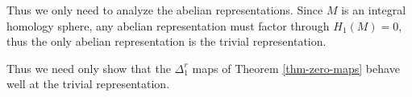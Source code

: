 \documentclass{slides}
\theoremstyle{definition}
\begin{document}
\begin{slide}
Thus we only need to analyze
the abelian representations.  Since $M$ is an integral homology
sphere, any abelian representation must factor through $H_1(M) = 0$,
thus the only abelian representation is the trivial representation.

Thus we need only show that the $\Delta^r_1$ maps of
Theorem \ref{thm-zero-maps} behave well at the trivial representation.
\end{slide}
\end{document}
